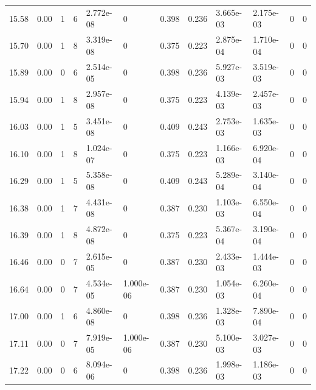 \documentclass[preview]{standalone}
\begin{document}
{{{\begin{tabular}{L{1.2cm}C{1.2cm} C{0.3cm}C{0.5cm} C{1.4cm}C{1.4cm} C{1.4cm}C{1.4cm} C{1.6cm}C{1.6cm} C{1.6cm}C{1.6cm}}
  15.58  &  0.00  & 1     &  6 &  2.772e-08  & 0  &  0.398&   0.236& 3.665e-03 & 2.175e-03   &  0 & 0  \\ 
  15.70  &  0.00  & 1     &  8 &  3.319e-08  & 0  &  0.375&   0.223& 2.875e-04 & 1.710e-04   &  0 & 0  \\ 
  15.89  &  0.00  & 0     &  6 &  2.514e-05  & 0  &  0.398&   0.236& 5.927e-03 & 3.519e-03   &  0 & 0  \\ 
  15.94  &  0.00  & 1     &  8 &  2.957e-08  & 0  &  0.375&   0.223& 4.139e-03 & 2.457e-03   &  0 & 0  \\ 
  16.03  &  0.00  & 1     &  5 &  3.451e-08  & 0  &  0.409&   0.243& 2.753e-03 & 1.635e-03   &  0 & 0  \\ 
  16.10  &  0.00  & 1     &  8 &  1.024e-07  & 0  &  0.375&   0.223& 1.166e-03 & 6.920e-04   &  0 & 0  \\ 
  16.29  &  0.00  & 1     &  5 &  5.358e-08  & 0  &  0.409&   0.243& 5.289e-04 & 3.140e-04   &  0 & 0  \\ 
  16.38  &  0.00  & 1     &  7 &  4.431e-08  & 0  &  0.387&   0.230& 1.103e-03 & 6.550e-04   &  0 & 0  \\ 
  16.39  &  0.00  & 1     &  8 &  4.872e-08  & 0  &  0.375&   0.223& 5.367e-04 & 3.190e-04   &  0 & 0  \\ 
  16.46  &  0.00  & 0     &  7 &  2.615e-05  & 0  &  0.387&   0.230& 2.433e-03 & 1.444e-03   &  0 & 0  \\ 
  16.64  &  0.00  & 0     &  7 &  4.534e-05  & 1.000e-06  &  0.387&   0.230& 1.054e-03 & 6.260e-04   &  0 & 0  \\ 
  17.00  &  0.00  & 1     &  6 &  4.860e-08  & 0  &  0.398&   0.236& 1.328e-03 & 7.890e-04   &  0 & 0  \\ 
  17.11  &  0.00  & 0     &  7 &  7.919e-05  & 1.000e-06  &  0.387&   0.230& 5.100e-03 & 3.027e-03   &  0 & 0  \\ 
  17.22  &  0.00  & 0     &  6 &  8.094e-06  & 0  &  0.398&   0.236& 1.998e-03 & 1.186e-03   &  0 & 0  \\ 
\hline 
\end{tabular} 

}}}
\end{document}
